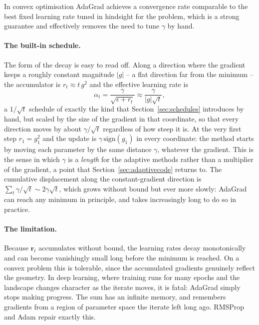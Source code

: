 In convex optimisation AdaGrad achieves a convergence rate comparable to the
best fixed learning rate tuned in hindsight for the problem, which is a strong
guarantee and effectively removes the need to tune $\gamma$ by hand.

\paragraph{The built-in schedule.}
The form of the decay is easy to read off.  Along a direction where the
gradient keeps a roughly constant magnitude $|g|$ -- a flat direction far
from the minimum -- the accumulator is $r_{t}\approx t\,g^{2}$ and the
effective learning rate is
\begin{equation}
  \alpha_{t}=\frac{\gamma}{\sqrt{\epsilon+r_{t}}}\approx\frac{\gamma}{|g|\sqrt{t}},
  \label{eq:4-adagradschedule}
\end{equation}
a $1/\sqrt{t}$ schedule of exactly the kind that Section~\ref{sec:schedules}
introduces by hand, but scaled by the size of the gradient in that
coordinate, so that every direction moves by about $\gamma/\sqrt{t}$
regardless of how steep it is.  At the very first step $r_1=g_1^{2}$ and the
update is $\gamma\,\mathrm{sign}(g_1)$ in every coordinate: the method
starts by moving each parameter by the same distance $\gamma$, whatever the
gradient.  This is the sense in which $\gamma$ is a \emph{length} for the
adaptive methods rather than a multiplier of the gradient, a point that
Section~\ref{sec:adaptivecode} returns to.  The cumulative displacement along
the constant-gradient direction is $\sum_t\gamma/\sqrt{t}\sim2\gamma\sqrt{t}$,
which grows without bound but ever more slowly: AdaGrad can reach any
minimum in principle, and takes increasingly long to do so in practice.

\paragraph{The limitation.}
Because $\bm{r}_t$ accumulates without bound, the learning rates decay
monotonically and can become vanishingly small long before the minimum is
reached.  On a convex problem this is tolerable, since the accumulated
gradients genuinely reflect the geometry.  In deep learning, where training
runs for many epochs and the landscape changes character as the iterate moves,
it is fatal: AdaGrad simply stops making progress.  The sum has an infinite
memory, and remembers gradients from a region of parameter space the iterate
left long ago.  RMSProp and Adam repair exactly this.

